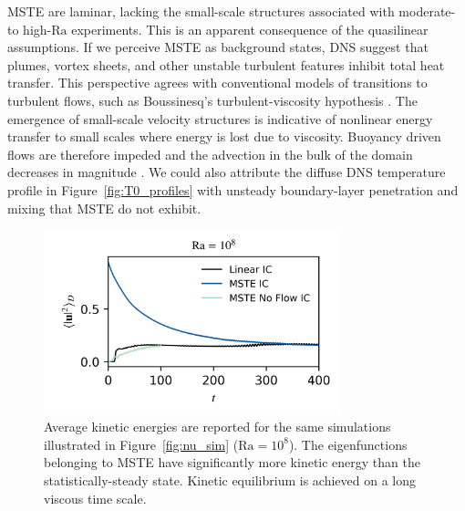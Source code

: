 \documentclass[reprint,amsmath,amssymb,aps,nofootinbib]{revtex4-1}
\newcommand\Ra{\mathrm{Ra}}
\begin{document}
MSTE are laminar, lacking the small-scale structures associated with moderate- to high-$\Ra$ experiments. 
This is an apparent consequence of the quasilinear assumptions. 
If we perceive MSTE as background states, DNS suggest that plumes, vortex sheets, and other unstable turbulent features inhibit total heat transfer. 
This perspective agrees with conventional models of transitions to turbulent flows, such as Boussinesq's turbulent-viscosity hypothesis \cite{boussinesq_1877}. 
The emergence of small-scale velocity structures is indicative of nonlinear energy transfer to small scales where energy is lost due to viscosity. 
Buoyancy driven flows are therefore impeded and the advection in the bulk of the domain decreases in magnitude \cite{drazin_reid_2004, pope_2000}. 
We could also attribute the diffuse DNS temperature profile in Figure~\ref{fig:T0_profiles} with unsteady boundary-layer penetration and mixing that MSTE do not exhibit.

\begin{figure}
    \centering
    \includegraphics[width=3.4in]{sim_eq_ke_noflow.png}
    \caption{Average kinetic energies are reported for the same simulations illustrated in Figure~\ref{fig:nu_sim} ($\Ra = 10^8$). 
    The eigenfunctions belonging to MSTE have significantly more kinetic energy than the statistically-steady state. 
    Kinetic equilibrium is achieved on a long viscous time scale.}
    \label{fig:ke_sim}
\end{figure}
\end{document}
